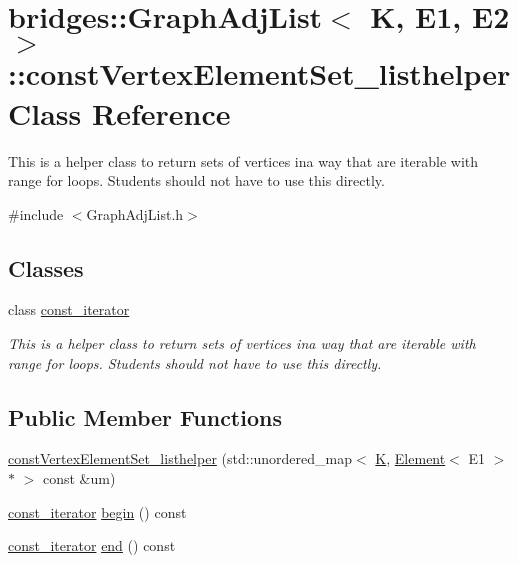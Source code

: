 \hypertarget{classbridges_1_1_graph_adj_list_1_1const_vertex_element_set__listhelper}{}\section{bridges\+:\+:Graph\+Adj\+List$<$ K, E1, E2 $>$\+:\+:const\+Vertex\+Element\+Set\+\_\+listhelper Class Reference}
\label{classbridges_1_1_graph_adj_list_1_1const_vertex_element_set__listhelper}


This is a helper class to return sets of vertices ina way that are iterable with range for loops. Students should not have to use this directly.  




{\ttfamily \#include $<$Graph\+Adj\+List.\+h$>$}

\subsection*{Classes}
\begin{DoxyCompactItemize}
\item 
class \hyperlink{classbridges_1_1_graph_adj_list_1_1const_vertex_element_set__listhelper_1_1const__iterator}{const\+\_\+iterator}
\begin{DoxyCompactList}\small\item\em This is a helper class to return sets of vertices ina way that are iterable with range for loops. Students should not have to use this directly. \end{DoxyCompactList}\end{DoxyCompactItemize}
\subsection*{Public Member Functions}
\begin{DoxyCompactItemize}
\item 
\hyperlink{classbridges_1_1_graph_adj_list_1_1const_vertex_element_set__listhelper_abfaf469c4ba34510664745aa57ab81b5}{const\+Vertex\+Element\+Set\+\_\+listhelper} (std\+::unordered\+\_\+map$<$ \hyperlink{namespacebridges_acfb0a4f7877d8f63de3e6862004c50edaa5f3c6a11b03839d46af9fb43c97c188}{K}, \hyperlink{classbridges_1_1_element}{Element}$<$ E1 $>$ $\ast$ $>$ const \&um)
\item 
\hyperlink{classbridges_1_1_graph_adj_list_1_1const_vertex_element_set__listhelper_1_1const__iterator}{const\+\_\+iterator} \hyperlink{classbridges_1_1_graph_adj_list_1_1const_vertex_element_set__listhelper_a006c4ee341ba478ea8f22c485a2c099d}{begin} () const
\item 
\hyperlink{classbridges_1_1_graph_adj_list_1_1const_vertex_element_set__listhelper_1_1const__iterator}{const\+\_\+iterator} \hyperlink{classbridges_1_1_graph_adj_list_1_1const_vertex_element_set__listhelper_a899b6c2765f09fd4e238cfaf869de667}{end} () const
\end{DoxyCompactItemize}


